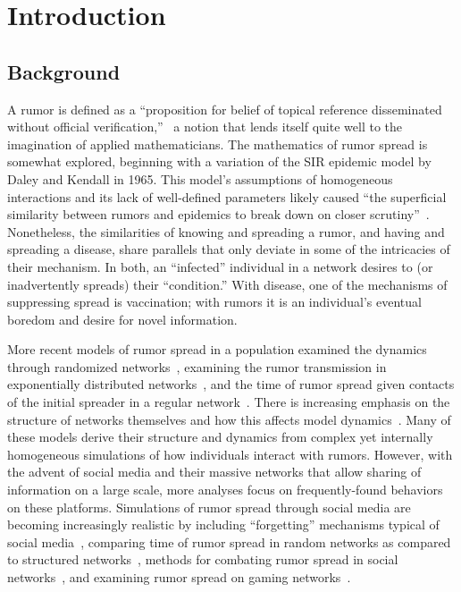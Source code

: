 \section{Introduction }
\label{sec:introduction}

\subsection{Background}
\label{subsec:background}

A rumor is defined as a ``proposition for belief of topical reference disseminated without official verification,''~\cite{knapp-1944} a notion that lends itself quite well to the imagination of applied mathematicians.
The mathematics of rumor spread is somewhat explored, beginning with a variation of the SIR epidemic model by Daley and Kendall in 1965.
This model's assumptions of homogeneous interactions and its lack of well-defined parameters likely caused ``the superficial similarity between rumors and epidemics to break down on closer scrutiny''~\cite{daley-1965}.
Nonetheless, the similarities of knowing and spreading a rumor, and having and spreading a disease, share parallels that only deviate in some of the intricacies of their mechanism.
In both, an ``infected'' individual in a network desires to (or inadvertently spreads) their ``condition.''
With disease, one of the mechanisms of suppressing spread is vaccination; with rumors it is an individual's eventual boredom and desire for novel information.

More recent models of rumor spread in a population examined the dynamics through randomized networks~\cite{karp-2000}, examining the rumor transmission in exponentially distributed networks~\cite{moreno-2004}, and the time of rumor spread given contacts of the initial spreader in a regular network~\cite{fount-2010}.
There is increasing emphasis on the structure of networks themselves and how this affects model dynamics~\cite{zhang-2013, pellis-2015, pellis-2012, ball-2010, zhou-2007}.
Many of these models derive their structure and dynamics from complex yet internally homogeneous simulations of how individuals interact with rumors.
However, with the advent of social media and their massive networks that allow sharing of information on a large scale, more analyses focus on frequently-found behaviors on these platforms.
Simulations of rumor spread through social media are becoming increasingly realistic by including ``forgetting'' mechanisms typical of social media~\cite{zhao-2011}, comparing time of rumor spread in random networks as compared to structured networks~\cite{liu-2011}, methods for combating rumor spread in social networks~\cite{tripathy-2010}, and examining rumor spread on gaming networks~\cite{grab-2008}.

